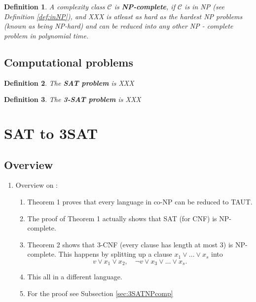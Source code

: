 \documentclass[a4paper]{report}
\newtheorem{defi}{Definition}[section]
\begin{document}
\begin{defi}\label{def:NPcomplete}
  A complexity class $\mathcal{C}$ is \textbf{NP-complete}, if $\mathcal{C}$ is in NP (see Definition \ref{def:inNP}), and XXX is atleast as hard as the hardest NP problems (known as being NP-hard) and can be reduced into any other NP - complete problem in polynomial time.
\end{defi}


\section{Computational problems}
\label{sec:computationalproblems}

\begin{defi}\label{def:SATproblem}
  The \textbf{SAT problem} is XXX
\end{defi}

\begin{defi}\label{def:3SATproblem}
  The \textbf{3-SAT problem} is XXX
\end{defi}




\chapter{SAT to 3SAT}
\label{cha:sat13}


\section{Overview}
\label{sec:sat13Overview}

\begin{enumerate}
\item Overview on \cite{Cook1971NP}:
  \begin{enumerate}
  \item Theorem 1 proves that every language in co-NP can be reduced to TAUT.
  \item The proof of Theorem 1 actually shows that SAT (for CNF) is NP-complete.
  \item Theorem 2 shows that 3-CNF (every clause has length at most 3) is NP-complete. This happens by splitting up a clause $x_1 \vee \dots \vee x_s$ into
    \begin{displaymath}
      v \vee x_1 \vee x_2, \quad \neg v \vee x_3 \vee \dots \vee x_s.
    \end{displaymath}
  \item This all in a different language.
  \item For the proof see Subsection \ref{sec:3SATNPcomp}
  \end{enumerate}
\end{enumerate}
\end{document}
